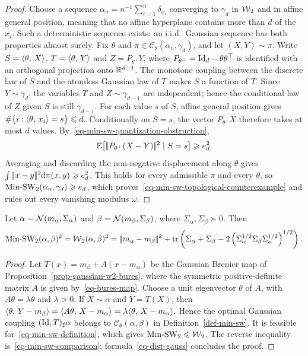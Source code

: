 \begin{proof}
Choose a sequence $\alpha_n=n^{-1}\sum_{i=1}^n\delta_{x_i}$ converging to $\gamma_d$ in $\operatorname{\mathcal{W}}_2$ and in affine general position, meaning that no affine hyperplane contains more than $d$ of the $x_i$. Such a deterministic sequence exists: an i.i.d.\ Gaussian sequence has both properties almost surely. Fix $\theta$ and $\pi\in\mathcal C_\theta(\alpha_n,\gamma_d)$, and let $(X,Y)\sim\pi$. Write
$S=\langle \theta,\,X\rangle$, $T=\langle \theta,\,Y\rangle$ and $Z=P_{\theta^\perp}Y$, where $P_{\theta^\perp}=\mathrm{Id}_d-\theta\theta^\top$ is identified with an orthogonal projection onto $\mathbb{R}^{d-1}$. The monotone coupling between the discrete law of $S$ and the atomless Gaussian law of $T$ makes $S$ a function of $T$. Since $Y\sim\gamma_d$, the variables $T$ and $Z\sim\gamma_{d-1}$ are independent; hence the conditional law of $Z$ given $S$ is still $\gamma_{d-1}$. For each value $s$ of $S$, affine general position gives
\(\#\{i:\langle \theta,\,x_i\rangle=s\}\leqslant d.\)
Conditionally on $S=s$, the vector $P_{\theta^\perp}X$ therefore takes at most $d$ values. By~\eqref{eq-min-sw-quantization-obstruction},
\[
\mathbb{E}\!\left[|\!| P_{\theta^\perp}(X-Y) |\!|^2\mid S=s\right]\geqslant e_d^2.
\]
Averaging and discarding the non-negative displacement along $\theta$ gives
$\int|\!| x-y |\!|^2\mathrm{d}\pi(x,y)\geqslant e_d^2$. This holds for every admissible $\pi$ and every $\theta$, so
$\operatorname{Min\text{-}SW}_2(\alpha_n,\gamma_d)\geqslant e_d$, which proves~\eqref{eq-min-sw-topological-counterexample} and rules out every vanishing modulus $\omega$.
\end{proof}
\begin{prop}\label{prop-min-sw-gaussians}
Let $\alpha=\mathcal{N}(m_\alpha,\Sigma_\alpha)$ and $\beta=\mathcal{N}(m_\beta,\Sigma_\beta)$, where $\Sigma_\alpha,\Sigma_\beta\succ0$. Then
\begin{equation}\label{eq-min-sw-gaussians}
\operatorname{Min\text{-}SW}_2(\alpha,\beta)^2
=
\operatorname{\mathcal{W}}_2(\alpha,\beta)^2
=
|\!| m_\alpha-m_\beta |\!|^2
+
\operatorname{tr}\left( 
\Sigma_\alpha+\Sigma_\beta
-2\left( \Sigma_\alpha^{1/2}\Sigma_\beta\Sigma_\alpha^{1/2} \right)^{1/2}
 \right).
\end{equation}
\end{prop}
\begin{proof}
Let $T(x)=m_\beta+A(x-m_\alpha)$ be the Gaussian Brenier map of Proposition~\ref{prop-gaussian-w2-bures}, where the symmetric positive-definite matrix $A$ is given by~\eqref{eq-bures-map}. Choose a unit eigenvector $\theta$ of $A$, with $A\theta=\lambda\theta$ and $\lambda>0$. If $X\sim\alpha$ and $Y=T(X)$, then
\(\langle \theta,\,Y-m_\beta\rangle = \langle A\theta,\,X-m_\alpha\rangle = \lambda\langle \theta,\,X-m_\alpha\rangle.\)
Hence the optimal Gaussian coupling $(\mathrm{Id},T)_\sharp\alpha$ belongs to $\mathcal C_\theta(\alpha,\beta)$ in Definition~\ref{def-min-sw}. It is feasible for~\eqref{eq-min-sw-definition}, which gives $\operatorname{Min\text{-}SW}_2\leqslant\operatorname{\mathcal{W}}_2$. The reverse inequality is~\eqref{eq-min-sw-comparison}; formula~\eqref{eq-dist-gauss} concludes the proof.
\end{proof}
